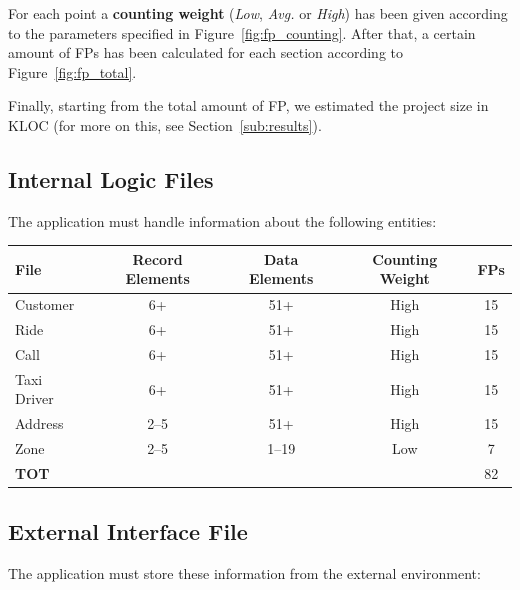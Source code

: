 For each point a \textbf{counting weight} (\emph{Low}, \emph{Avg.} or \emph{High}) has been given according to the parameters specified in Figure~\ref{fig:fp_counting}. After that, a certain amount of FPs has been calculated for each section according to Figure~\ref{fig:fp_total}.

Finally, starting from the total amount of FP, we estimated the project size in KLOC (for more on this, see Section~\ref{sub:results}).

\subsection{Internal Logic Files} %
\label{sub:ilf}
The application must handle information about the following entities:

\begin{table}[h]
    \label{tab:ilf}
    \centering

    \begin{tabular}{l|cccc}
    \hline

    \hline
    \textbf{File} & \textbf{Record Elements} & \textbf{Data Elements} & \textbf{Counting Weight} & \textbf{FPs} \\
    \hline
        Customer    &   6+     &   51+     &   High    &   15 \\
        Ride    &   6+     &   51+     &   High    &   15 \\
        Call    &   6+     &   51+     &   High    &   15 \\
        Taxi Driver & 6+    &   51+     &   High    &   15 \\
        Address    &   2--5     &   51+     &   High    &   15 \\
        Zone    &   2--5     &   1--19     &   Low    &   7 \\
    \hline
        \textbf{TOT}    &   &   &   & 82 \\
    \hline
        
    \end{tabular}
\end{table}

\subsection{External Interface File} %
\label{sub:eif}
The application must store these information from the external environment:

